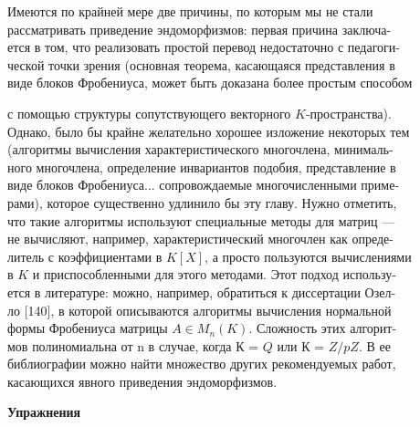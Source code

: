 \documentclass{../template/mai_book}
\begin{document}
\medskip

Имеются по крайней мере две причины, по которым мы не стали\\ 
рассматривать приведение эндоморфизмов: первая причина 
заключа-\\ется в том, что реализовать простой перевод недостаточно с 
педагоги-\\ческой точки зрения (основная теорема, касающаяся представления в\\ виде блоков Фробениуса, может быть доказана более простым способом

\pagebreak

\noindent с помощью структуры сопутствующего векторного $K$-пространства).\\ 
Однако, было бы крайне желательно хорошее изложение некоторых тем\\ 
(алгоритмы вычисления характеристического многочлена, 
минималь-\\ного многочлена, определение инвариантов подобия, представление в\\ виде блоков Фробениуса... сопровождаемые многочисленными 
приме-\\рами), которое существенно удлинило бы эту главу. Нужно отметить,\\ 
что такие алгоритмы используют специальные методы для матриц —\\ 
не вычисляют, например, характеристический многочлен как 
опреде-\\литель с коэффициентами в $K[X]$, а просто пользуются вычислениями\\ 
в $K$ и приспособленными для этого методами. Этот подход 
использу-\\ется в литературе: можно, например, обратиться к диссертации Озел-\\ ло [140], в которой описываются алгоритмы вычисления нормальной\\ 
формы Фробениуса матрицы $A \in M_n(K)$. Сложность этих 
алгорит-\\мов полиномиальна от n в случае, когда $К$ = $Q$ или $К$ = $Z/pZ$. В ее \\
библиографии можно найти множество других рекомендуемых работ,\\ 
касающихся явного приведения эндоморфизмов.

\pagebreak

\begin{center}
{\large\bf Упражнения}
\end{center}
\end{document}

